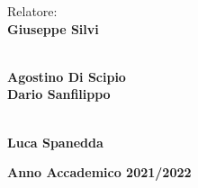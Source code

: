 \begin{multicols}{2}
\noindent \large{Relatore:} \\
\large{\textbf{Giuseppe Silvi}} \\
\vspace{0.1cm}

 \\
\large{\textbf{Agostino Di Scipio}} \\
\large{\textbf{Dario Sanfilippo}} \\
\vspace{0.1cm}

\columnbreak

 \\
\large{\textbf{Luca Spanedda}} \\
\end{multicols}
\vspace{2cm}

\begin{center}
    \large{\textbf{Anno Accademico 2021/2022}}
\end{center}